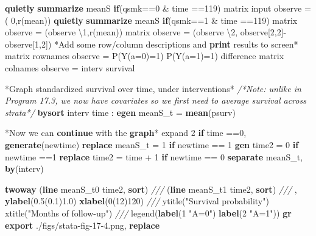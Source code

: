 \documentclass[
  10pt,
]{book}
\newenvironment{Shaded}{\begin{snugshade}}{\end{snugshade}}
\newcommand{\BaseNTok}[1]{\textcolor[rgb]{0.00,0.00,0.81}{#1}}
\newcommand{\CommentTok}[1]{\textcolor[rgb]{0.56,0.35,0.01}{\textit{#1}}}
\newcommand{\FunctionTok}[1]{\textcolor[rgb]{0.00,0.00,0.00}{#1}}
\newcommand{\KeywordTok}[1]{\textcolor[rgb]{0.13,0.29,0.53}{\textbf{#1}}}
\newcommand{\NormalTok}[1]{#1}
\newcommand{\OtherTok}[1]{\textcolor[rgb]{0.56,0.35,0.01}{#1}}
\newcommand{\StringTok}[1]{\textcolor[rgb]{0.31,0.60,0.02}{#1}}
\begin{document}
\begin{Shaded}
\begin{Highlighting}[]
\KeywordTok{quietly} \KeywordTok{summarize}\NormalTok{ meanS }\KeywordTok{if}\NormalTok{(qsmk==0  \& time ==119)}
\FunctionTok{matrix}\NormalTok{ input observe = ( 0,}\OtherTok{\textasciigrave{}r(mean)\textquotesingle{}}\NormalTok{)}
\KeywordTok{quietly} \KeywordTok{summarize}\NormalTok{ meanS }\KeywordTok{if}\NormalTok{(qsmk==1  \& time ==119)}
\FunctionTok{matrix}\NormalTok{ observe = (observe \textbackslash{}1,}\OtherTok{\textasciigrave{}r(mean)\textquotesingle{}}\NormalTok{)}
\FunctionTok{matrix}\NormalTok{ observe = (observe \textbackslash{}2, observe[2,2]{-}observe[1,2]) }
\NormalTok{*Add some }\OtherTok{row}\NormalTok{/column descriptions and }\KeywordTok{print}\NormalTok{ results to screen*}
\FunctionTok{matrix} \OtherTok{rownames}\NormalTok{ observe =  P(Y(a=0)=1) P(Y(a=1)=1) difference}
\FunctionTok{matrix} \OtherTok{colnames}\NormalTok{ observe = interv survival}

\NormalTok{*Graph standardized survival }\BaseNTok{over}\NormalTok{ time, under interventions*}
\CommentTok{/*Note: unlike in Program 17.3, we now have covariates }
\CommentTok{so we first need to average survival across strata*/}
\KeywordTok{bysort}\NormalTok{ interv time : }\KeywordTok{egen}\NormalTok{ meanS\_t = }\KeywordTok{mean}\NormalTok{(psurv)}

\NormalTok{*Now we can }\KeywordTok{continue}\NormalTok{ with the }\KeywordTok{graph}\NormalTok{*}
\NormalTok{expand 2 }\KeywordTok{if}\NormalTok{ time ==0, }\KeywordTok{generate}\NormalTok{(newtime)}
\KeywordTok{replace}\NormalTok{ meanS\_t  = 1 }\KeywordTok{if}\NormalTok{ newtime == 1}
\KeywordTok{gen}\NormalTok{ time2 = 0 }\KeywordTok{if}\NormalTok{ newtime ==1}
\KeywordTok{replace}\NormalTok{ time2 = time + 1 }\KeywordTok{if}\NormalTok{ newtime == 0}
\KeywordTok{separate}\NormalTok{ meanS\_t, }\KeywordTok{by}\NormalTok{(interv) }

\KeywordTok{twoway}\NormalTok{ (}\KeywordTok{line}\NormalTok{ meanS\_t0 time2, }\KeywordTok{sort}\NormalTok{) }\CommentTok{///}
\NormalTok{  (}\KeywordTok{line}\NormalTok{ meanS\_t1 time2, }\KeywordTok{sort}\NormalTok{) }\CommentTok{///}
\NormalTok{  , }\KeywordTok{ylabel}\NormalTok{(0.5(0.1)1.0) }\KeywordTok{xlabel}\NormalTok{(0(12)120) }\CommentTok{///}
  \BaseNTok{ytitle}\NormalTok{(}\StringTok{"Survival probability"}\NormalTok{) }\BaseNTok{xtitle}\NormalTok{(}\StringTok{"Months of follow{-}up"}\NormalTok{) }\CommentTok{///}
  \BaseNTok{legend}\NormalTok{(}\KeywordTok{label}\NormalTok{(1 }\StringTok{"A=0"}\NormalTok{) }\KeywordTok{label}\NormalTok{(2 }\StringTok{"A=1"}\NormalTok{))}
\KeywordTok{gr} \KeywordTok{export}\NormalTok{ ./figs/stata{-}fig{-}17{-}4.png, }\KeywordTok{replace}


\end{Highlighting}
\end{Shaded}
\end{document}
